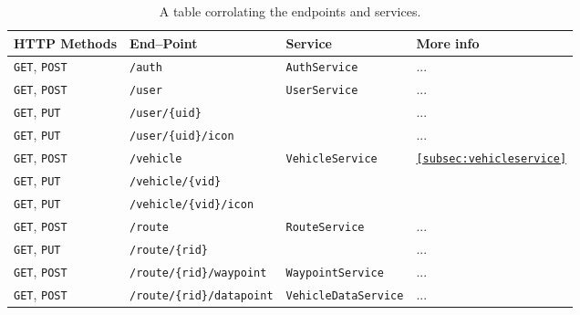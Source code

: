 \begin{table}[ht]
    \centering
    \small
    \setlength\extrarowheight{1pt}
    \begin{tabularx}{0.9\textwidth}{l p{13em} l l}
        \textbf{HTTP Methods}       & \textbf{End--Point}               & \textbf{Service}             & \textbf{More info}  \\ \hline
        \texttt{GET}, \texttt{POST} & \texttt{/auth}                    & \texttt{AuthService}         & ... \\ \tblgrpsep
        \texttt{GET}, \texttt{POST} & \texttt{/user}                    & \multirow{3}{*}{\texttt{UserService}}         & ... \\
        \texttt{GET}, \texttt{PUT}  & \texttt{/user/\{uid\}}            &          & ... \\
        \texttt{GET}, \texttt{PUT}  & \texttt{/user/\{uid\}/icon}       &          & ... \\ \tblgrpsep

        \texttt{GET}, \texttt{POST} & \texttt{/vehicle}                 & \multirow{3}{*}{\texttt{VehicleService}}      & \multirow{3}{*}{\texttt{\cref{subsec:vehicleservice}}} \\
        \texttt{GET}, \texttt{PUT}  & \texttt{/vehicle/\{vid\}}         &       &  \\
        \texttt{GET}, \texttt{PUT}  & \texttt{/vehicle/\{vid\}/icon}    &       &  \\ \tblgrpsep

        \texttt{GET}, \texttt{POST} & \texttt{/route}                   & \multirow{2}{*}{\texttt{RouteService}}        & ... \\
        \texttt{GET}, \texttt{PUT}  & \texttt{/route/\{rid\}}           &        & ... \\
        \texttt{GET}, \texttt{POST} & \texttt{/route/\{rid\}/waypoint}  & \texttt{WaypointService}     & ... \\
        \texttt{GET}, \texttt{POST} & \texttt{/route/\{rid\}/datapoint} & \texttt{VehicleDataService}  & ... \\ 
    \end{tabularx}
    \caption{A table corrolating the endpoints and services.}\label{table:endpointservice}
\end{table}
